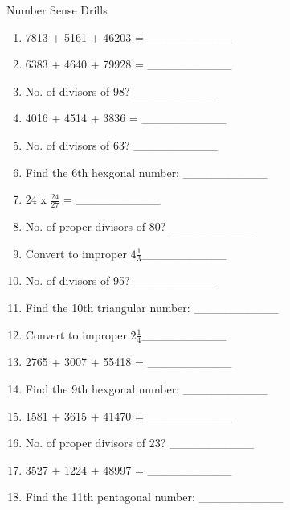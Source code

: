 \documentclass{article}
\begin{document}
\begin{center}{\Large Number Sense Drills}\end{center}
\begin{multicols}{2}
\begin{enumerate}
\item 7813 + 5161 + 46203 = \_\_\_\_\_\_\_\_\_\_ \\ 
\item 6383 + 4640 + 79928 = \_\_\_\_\_\_\_\_\_\_ \\ 
\item No. of divisors of 98? \_\_\_\_\_\_\_\_\_\_ \\ 
\item 4016 + 4514 + 3836 = \_\_\_\_\_\_\_\_\_\_ \\ 
\item No. of divisors of 63? \_\_\_\_\_\_\_\_\_\_ \\ 
\item Find the 6th hexgonal number:  \_\_\_\_\_\_\_\_\_\_ \\ 
\item $24$ x $\frac{24}{27}$ = \_\_\_\_\_\_\_\_\_\_ \\ 
\item No. of proper divisors of 80? \_\_\_\_\_\_\_\_\_\_ \\ 
\item Convert to improper $4\frac{1}{3}$\_\_\_\_\_\_\_\_\_\_ \\ 
\item No. of divisors of 95? \_\_\_\_\_\_\_\_\_\_ \\ 
\item Find the 10th triangular number:  \_\_\_\_\_\_\_\_\_\_ \\ 
\item Convert to improper $2\frac{1}{4}$\_\_\_\_\_\_\_\_\_\_ \\ 
\item 2765 + 3007 + 55418 = \_\_\_\_\_\_\_\_\_\_ \\ 
\item Find the 9th hexgonal number:  \_\_\_\_\_\_\_\_\_\_ \\ 
\item 1581 + 3615 + 41470 = \_\_\_\_\_\_\_\_\_\_ \\ 
\item No. of proper divisors of 23? \_\_\_\_\_\_\_\_\_\_ \\ 
\item 3527 + 1224 + 48997 = \_\_\_\_\_\_\_\_\_\_ \\ 
\item Find the 11th pentagonal number:  \_\_\_\_\_\_\_\_\_\_ \\ 

\end{enumerate}
\end{multicols}
\end{document}
